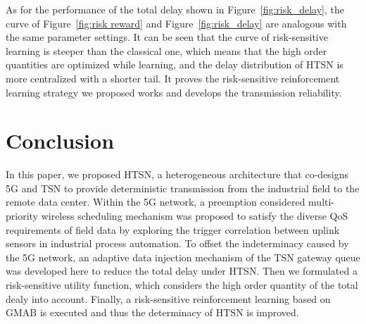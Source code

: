 \documentclass{SCIS2021}
\begin{document}
	\par As for the performance of the total delay shown in Figure~\ref{fig:risk_delay}, the curve of Figure~\ref{fig:risk reward} and Figure~\ref{fig:risk_delay} are analogous with the same parameter settings. It can be seen that the curve of risk-sensitive learning is steeper than the classical one, which means that the high order quantities are optimized while learning, and the delay distribution of HTSN is more centralized with a shorter tail. It proves the risk-sensitive reinforcement learning strategy we proposed works and develops the transmission reliability.


	\section{Conclusion}
	\label{con}
	\par In this paper, we proposed HTSN, a heterogeneous architecture that co-designs 5G and TSN to provide deterministic transmission from the industrial field to the remote data center. Within the 5G network, a preemption considered multi-priority wireless scheduling mechanism was proposed to satisfy the diverse QoS requirements of field data by exploring the trigger correlation between uplink sensors in industrial process automation. To offset the indeterminacy caused by the 5G network, an adaptive data injection mechanism of the TSN gateway queue was developed here to reduce the total delay under HTSN. Then we formulated a risk-sensitive utility function, which considers the high order quantity of the total dealy into account. Finally, a risk-sensitive reinforcement learning based on GMAB is executed and thus the determinacy of HTSN is improved.








\end{document}
